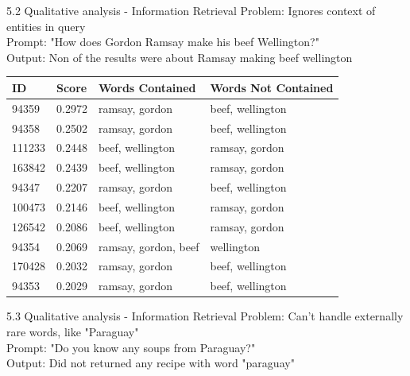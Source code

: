 \documentclass{beamer}
\begin{document}
\begin{frame} {5.2 Qualitative analysis - Information Retrieval}
  Problem: Ignores context of entities in query\\
  Prompt: "How does Gordon Ramsay make his beef Wellington?"\\
  Output: Non of the results were about Ramsay making beef wellington
  \begin{table}[]
    \centering
    \begin{tabular}{|l|l|l|l|}
      \hline
      \textbf{ID} & \textbf{Score} & \textbf{Words Contained} & \textbf{Words Not Contained} \\ \hline
      94359       & 0.2972         & ramsay, gordon           & beef, wellington             \\ \hline
      94358       & 0.2502         & ramsay, gordon           & beef, wellington             \\ \hline
      111233      & 0.2448         & beef, wellington         & ramsay, gordon               \\ \hline
      163842      & 0.2439         & beef, wellington         & ramsay, gordon               \\ \hline
      94347       & 0.2207         & ramsay, gordon           & beef, wellington             \\ \hline
      100473      & 0.2146         & beef, wellington         & ramsay, gordon               \\ \hline
      126542      & 0.2086         & beef, wellington         & ramsay, gordon               \\ \hline
      94354       & 0.2069         & ramsay, gordon, beef     & wellington                   \\ \hline
      170428      & 0.2032         & ramsay, gordon           & beef, wellington             \\ \hline
      94353       & 0.2029         & ramsay, gordon           & beef, wellington             \\ \hline
    \end{tabular}
  \end{table}
\end{frame}

\begin{frame} {5.3 Qualitative analysis - Information Retrieval}
  Problem: Can't handle externally rare words, like "Paraguay"\\
  Prompt: "Do you know any soups from Paraguay?"\\
  Output: Did not returned any recipe with word "paraguay"
\end{frame}
\end{document}
